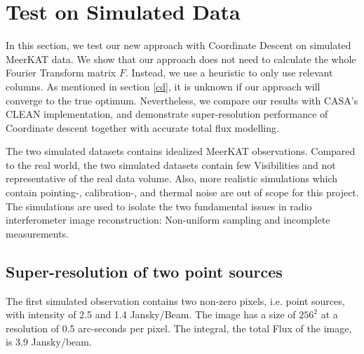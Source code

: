 \section{Test on Simulated Data}\label{results}
In this section, we test our new approach with Coordinate Descent on simulated MeerKAT data. We show that our approach does not need to calculate the whole Fourier Transform matrix $F$. Instead, we use a heuristic to only use relevant columns. As mentioned in section \ref{cd}, it is unknown if our approach will converge to the true optimum. Nevertheless, we compare our results with CASA's CLEAN implementation, and demonstrate super-resolution performance of Coordinate descent together with accurate total flux modelling.

The two simulated datasets contains idealized MeerKAT observations. Compared to the real world, the two simulated datasets contain few Visibilities and not representative of the real data volume. Also, more realistic simulations which contain pointing-, calibration-, and thermal noise are out of scope for this project. The simulations are used to isolate the two fundamental issues in radio interferometer image reconstruction: Non-uniform sampling and incomplete measurements.

\subsection{Super-resolution of two point sources}
The first simulated observation contains two non-zero pixels, i.e. point sources, with intensity of 2.5 and 1.4 Jansky/Beam. The image has a size of $256^2$ at a resolution of 0.5 arc-seconds per pixel. The integral, the total Flux of the image, is 3.9 Jansky/beam.

